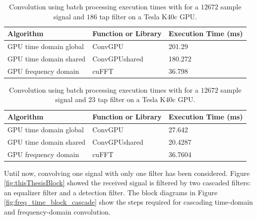 \begin{table}
\caption{Convolution using batch processing execution times with for a $12672$ sample signal and $186$ tap filter on a Tesla K40c GPU.}
\begin{center}
\begin{tabular}{lll}
	\toprule
	Algorithm 				& Function or Library		& Execution Time (ms) \\ \midrule
	GPU time domain global 	& ConvGPU 					& 201.29		\\
	GPU time domain shared 	& ConvGPUshared 			& 180.272		\\
	GPU frequency domain 	& cuFFT						& 36.798 		\\ 
	\bottomrule
\end{tabular}
\end{center}
\label{tab:Batched_CPUvsGPUtable_12672_186}
\end{table}
\begin{table}
\caption{Convolution using batch processing execution times with for a $12672$ sample signal and $23$ tap filter on a Tesla K40c GPU.}
\begin{center}
\begin{tabular}{lll}
	\toprule
	Algorithm 				& Function or Library		& Execution Time (ms) \\ \midrule
	GPU time domain global 	& ConvGPU 					& 27.642		\\
	GPU time domain shared 	& ConvGPUshared 			& 20.4287		\\
	GPU frequency domain 	& cuFFT						& 36.7604		\\ 
	\bottomrule
\end{tabular}
\end{center}
\label{tab:Batched_CPUvsGPUtable_12672_21}
\end{table}

Until now, convolving one signal with only one filter has been considered.
Figure \ref{fig:thisThesisBlock} showed the received signal is filtered by two cascaded filters: 
an equalizer filter and a detection filter.
The block diagrams in Figure \ref{fig:freq_time_block_cascade} show the steps required for cascading time-domain and frequency-domain convolution.

